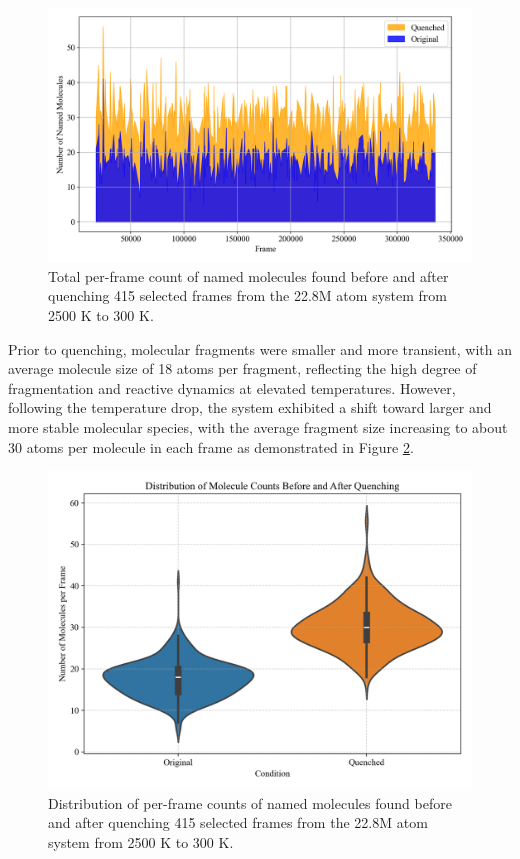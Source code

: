 \begin{figure}[!h]
    \centering
    \includegraphics[width=1\linewidth]{Images/early_earth/mol_counts-before-after-quench.png}
    \caption[Line plot: total named molecules found before and after quenching system]{Total per-frame count of named molecules found before and after quenching 415 selected frames from the 22.8M atom system from 2500 K to 300 K.}
    \label{fig:ee_quench_lineplot}
\end{figure}

Prior to quenching, molecular fragments were smaller and more transient, with an average molecule size of 18 atoms per fragment, reflecting the high degree of fragmentation and reactive dynamics at elevated temperatures. However, following the temperature drop, the system exhibited a shift toward larger and more stable molecular species, with the average fragment size increasing to about 30 atoms per molecule in each frame as demonstrated in Figure \ref{fig:ee_quench_violinplot}.

\begin{figure}[!ht]
    \centering
    \includegraphics[width=1\linewidth]{Images/early_earth/violinplot-mol_counts-before-after-quench.png}
    \caption[Violin plot: total named molecules found before and after quenching system]{Distribution of per-frame counts of named molecules found before and after quenching 415 selected frames from the 22.8M atom system from 2500 K to 300 K.}
    \label{fig:ee_quench_violinplot}
\end{figure}

